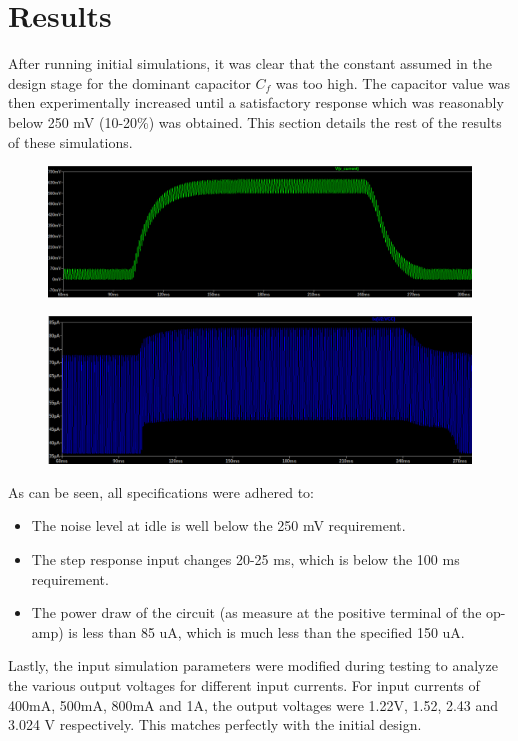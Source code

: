 \chapter{Results}\label{ch:results}

After running initial simulations, it was clear that the constant assumed in the design stage for the dominant capacitor $C_f$ was too high. The capacitor value was then experimentally
increased until a satisfactory response which was reasonably below 250 mV (10-20\%) was obtained. This section details the rest of the results of these simulations.

\begin{figure}[h!]
   \centering
   \includegraphics[width=.6\linewidth]{Figures/simulation_response}
   \label{fig:simulation response}
\end{figure}

\begin{figure}[h!]
   \centering
   \includegraphics[width=.5\linewidth]{Figures/simulation_current}
   \label{fig:simulation_current}
\end{figure}

As can be seen, all specifications were adhered to:
\begin{itemize}
   \item The noise level at idle is well below the 250 mV requirement.
   \item The step response input changes 20-25 ms, which is below the 100 ms requirement.
   \item The power draw of the circuit (as measure at the positive terminal of the op-amp) is less than 85 uA, which is much less than the specified 150 uA.
\end{itemize}

Lastly, the input simulation parameters were modified during testing to analyze the various output voltages for different input currents. For input currents of 400mA, 500mA, 800mA and 1A,
the output voltages were 1.22V, 1.52, 2.43 and 3.024 V respectively. This matches perfectly with the initial design.